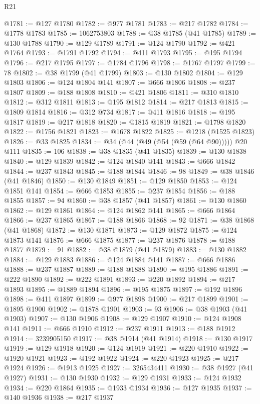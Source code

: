 \begin{lexlean}{R21}
\begin{coremodule}
@1781 := @127 @1780
@1782 := @977 @1781
@1783 := @217 @1782
@1784 := @1778 @1783
@1785 := 1062753803
@1788 := @38 @1785 (@41 @1785)
@1789 := @130 @1788
@1790 := @129 @1789
@1791 := @124 @1790
@1792 := @421 @1764
@1793 := @1791 @1792
@1794 := @411 @1793
@1795 := @195 @1794
@1796 := @217 @1795
@1797 := @1784 @1796
@1798 := @1767 @1797
@1799 := 78
@1802 := @38 @1799 (@41 @1799)
@1803 := @130 @1802
@1804 := @129 @1803
@1806 := @124 @1804 @141
@1807 := @666 @1806
@1808 := @237 @1807
@1809 := @188 @1808
@1810 := @421 @1806
@1811 := @310 @1810
@1812 := @312 @1811
@1813 := @195 @1812
@1814 := @217 @1813
@1815 := @1809 @1814
@1816 := @312 @734
@1817 := @411 @1816
@1818 := @195 @1817
@1819 := @217 @1818
@1820 := @1815 @1819
@1821 := @1798 @1820
@1822 := @1756 @1821
@1823 := @1678 @1822
@1825 := @1218 (@1525 @1823)
@1826 := @33 @1825
@1834 := @34 (@44 (@49 (@54 (@59 (@64 @90))))) @20 @111
@1835 := 106
@1838 := @38 @1835 (@41 @1835)
@1839 := @130 @1838
@1840 := @129 @1839
@1842 := @124 @1840 @141
@1843 := @666 @1842
@1844 := @237 @1843
@1845 := @188 @1844
@1846 := 98
@1849 := @38 @1846 (@41 @1846)
@1850 := @130 @1849
@1851 := @129 @1850
@1853 := @124 @1851 @141
@1854 := @666 @1853
@1855 := @237 @1854
@1856 := @188 @1855
@1857 := 94
@1860 := @38 @1857 (@41 @1857)
@1861 := @130 @1860
@1862 := @129 @1861
@1864 := @124 @1862 @141
@1865 := @666 @1864
@1866 := @237 @1865
@1867 := @188 @1866
@1868 := 92
@1871 := @38 @1868 (@41 @1868)
@1872 := @130 @1871
@1873 := @129 @1872
@1875 := @124 @1873 @141
@1876 := @666 @1875
@1877 := @237 @1876
@1878 := @188 @1877
@1879 := 91
@1882 := @38 @1879 (@41 @1879)
@1883 := @130 @1882
@1884 := @129 @1883
@1886 := @124 @1884 @141
@1887 := @666 @1886
@1888 := @237 @1887
@1889 := @188 @1888
@1890 := @195 @1886
@1891 := @222 @1890
@1892 := @222 @1891
@1893 := @220 @1892
@1894 := @217 @1893
@1895 := @1889 @1894
@1896 := @195 @1875
@1897 := @192 @1896
@1898 := @411 @1897
@1899 := @977 @1898
@1900 := @217 @1899
@1901 := @1895 @1900
@1902 := @1878 @1901
@1903 := 93
@1906 := @38 @1903 (@41 @1903)
@1907 := @130 @1906
@1908 := @129 @1907
@1910 := @124 @1908 @141
@1911 := @666 @1910
@1912 := @237 @1911
@1913 := @188 @1912
@1914 := 3239905150
@1917 := @38 @1914 (@41 @1914)
@1918 := @130 @1917
@1919 := @129 @1918
@1920 := @124 @1919
@1921 := @220 @1910
@1922 := @1920 @1921
@1923 := @192 @1922
@1924 := @220 @1923
@1925 := @217 @1924
@1926 := @1913 @1925
@1927 := 3265434411
@1930 := @38 @1927 (@41 @1927)
@1931 := @130 @1930
@1932 := @129 @1931
@1933 := @124 @1932
@1934 := @220 @1864
@1935 := @1933 @1934
@1936 := @127 @1935
@1937 := @140 @1936
@1938 := @217 @1937

\end{coremodule}
\end{lexlean}
